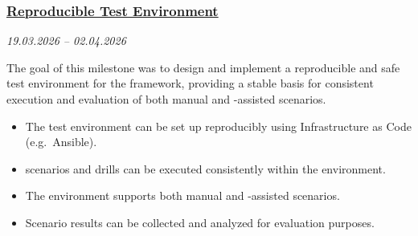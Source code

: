 \subsubsection{\href{https://gitlab.ti.bfh.ch/groups/gausf1-vonal3/-/milestones/20}{Reproducible Test Environment}}\label{subsubsec:milestone-test-environment}
\textit{19.03.2026 -- 02.04.2026}

The goal of this milestone was to design and implement a reproducible and safe test environment for the  framework, providing a stable basis for consistent execution and evaluation of both manual and -assisted scenarios.

\begin{itemize}
    \item[$\checkmark$] The test environment can be set up reproducibly using Infrastructure as Code (e.g.\ Ansible).
    \item[$\checkmark$]  scenarios and drills can be executed consistently within the environment.
    \item[$\checkmark$] The environment supports both manual and -assisted scenarios.
    \item[$\checkmark$] Scenario results can be collected and analyzed for evaluation purposes.
\end{itemize}
